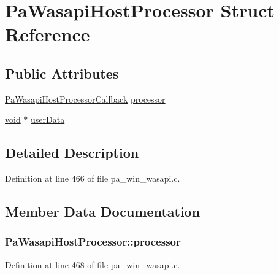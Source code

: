 \hypertarget{struct_pa_wasapi_host_processor}{}\section{Pa\+Wasapi\+Host\+Processor Struct Reference}
\label{struct_pa_wasapi_host_processor}
\subsection*{Public Attributes}
\begin{DoxyCompactItemize}
\item 
\hyperlink{pa__win__wasapi_8h_ae3d91dd8eaeff3cbe9ff3bfafc5e6006}{Pa\+Wasapi\+Host\+Processor\+Callback} \hyperlink{struct_pa_wasapi_host_processor_a536e48cc36c6a8649c75916464a036e7}{processor}
\item 
\hyperlink{sound_8c_ae35f5844602719cf66324f4de2a658b3}{void} $\ast$ \hyperlink{struct_pa_wasapi_host_processor_abb4a8d12910d22829a9e75159b379298}{user\+Data}
\end{DoxyCompactItemize}


\subsection{Detailed Description}


Definition at line 466 of file pa\+\_\+win\+\_\+wasapi.\+c.



\subsection{Member Data Documentation}
\subsubsection[{\texorpdfstring{processor}{processor}}]{ Pa\+Wasapi\+Host\+Processor\+::processor}\hypertarget{struct_pa_wasapi_host_processor_a536e48cc36c6a8649c75916464a036e7}{}\label{struct_pa_wasapi_host_processor_a536e48cc36c6a8649c75916464a036e7}


Definition at line 468 of file pa\+\_\+win\+\_\+wasapi.\+c.

